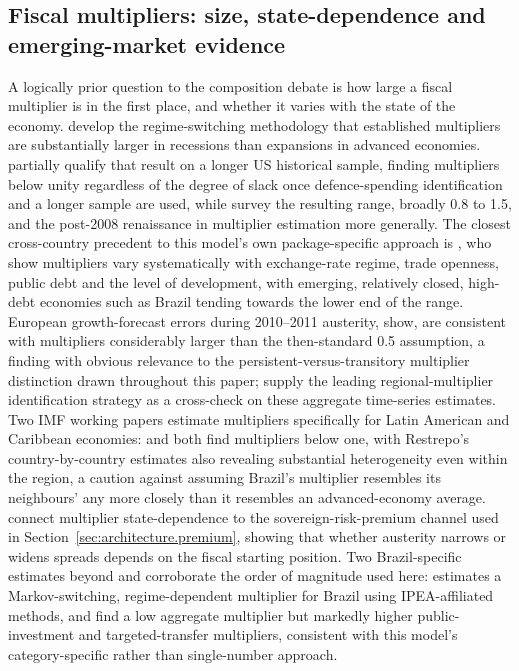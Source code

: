 \documentclass[11pt,a4paper]{article}
\begin{document}
\subsection{Fiscal multipliers: size, state-dependence and emerging-market evidence}
\label{sec:lit-multipliers}

A logically prior question to the composition debate is how large a fiscal multiplier is in the first place, and whether it varies with the state of the economy. \citet{auerbachgorodnichenko2012} develop the regime-switching methodology that established multipliers are substantially larger in recessions than expansions in advanced economies. \citet{rameyzubairy2018} partially qualify that result on a longer US historical sample, finding multipliers below unity regardless of the degree of slack once defence-spending identification and a longer sample are used, while \citet{ramey2011,ramey2019} survey the resulting range, broadly 0.8 to 1.5, and the post-2008 renaissance in multiplier estimation more generally. The closest cross-country precedent to this model's own package-specific approach is \citet{ilzetzkimendozavegh2013}, who show multipliers vary systematically with exchange-rate regime, trade openness, public debt and the level of development, with emerging, relatively closed, high-debt economies such as Brazil tending towards the lower end of the range. European growth-forecast errors during 2010--2011 austerity, \citet{blanchardleigh2013} show, are consistent with multipliers considerably larger than the then-standard 0.5 assumption, a finding with obvious relevance to the persistent-versus-transitory multiplier distinction drawn throughout this paper; \citet{nakamurasteinsson2014} supply the leading regional-multiplier identification strategy as a cross-check on these aggregate time-series estimates. Two IMF working papers estimate multipliers specifically for Latin American and Caribbean economies: \citet{carriereswallowdavidleigh2018} and \citet{restrepo2020} both find multipliers below one, with Restrepo's country-by-country estimates also revealing substantial heterogeneity even within the region, a caution against assuming Brazil's multiplier resembles its neighbours' any more closely than it resembles an advanced-economy average. \citet{bornmullerpfeifer2020} connect multiplier state-dependence to the sovereign-risk-premium channel used in Section~\ref{sec:architecture.premium}, showing that whether austerity narrows or widens spreads depends on the fiscal starting position. Two Brazil-specific estimates beyond \citet{sanches2026} and \citet{carvalhosanches2019} corroborate the order of magnitude used here: \citet{pires2014} estimates a Markov-switching, regime-dependent multiplier for Brazil using IPEA-affiliated methods, and \citet{resendepires2021} find a low aggregate multiplier but markedly higher public-investment and targeted-transfer multipliers, consistent with this model's category-specific rather than single-number approach.
\end{document}
